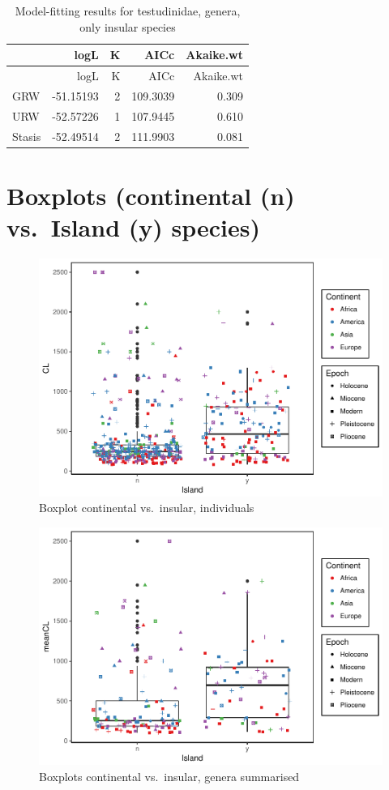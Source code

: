 \documentclass[]{article}
\begin{document}
\begin{longtable}[]{@{}lrrrr@{}}
\caption{Model-fitting results for testudinidae, genera, only insular
species}\tabularnewline
\toprule
& logL & K & AICc & Akaike.wt\tabularnewline
\midrule
\endfirsthead
\toprule
& logL & K & AICc & Akaike.wt\tabularnewline
\midrule
\endhead
GRW & -51.15193 & 2 & 109.3039 & 0.309\tabularnewline
URW & -52.57226 & 1 & 107.9445 & 0.610\tabularnewline
Stasis & -52.49514 & 2 & 111.9903 & 0.081\tabularnewline
\bottomrule
\end{longtable}

\newpage

\section{Boxplots (continental (n) vs.~Island (y)
species)}\label{boxplots-continental-n-vs.island-y-species}

\begin{figure}[htbp]
\centering
\includegraphics{MA_JJ_files/figure-latex/Boxplot continental vs. insular, individuals-1.pdf}
\caption{Boxplot continental vs.~insular, individuals}
\end{figure}

\begin{figure}[htbp]
\centering
\includegraphics{MA_JJ_files/figure-latex/Boxplots, genera summarised-1.pdf}
\caption{Boxplots continental vs.~insular, genera summarised}
\end{figure}
\end{document}
